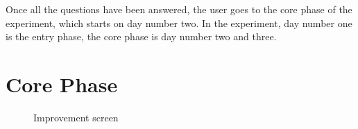 Once all the questions have been answered, the user goes to the core phase of the experiment, which starts on day number two. In the experiment, day number one is the entry phase, the core phase is day number two and three.

\section{Core Phase} \label{core}


\begin{figure}[htp]
  \hspace{1em}
  \caption{Improvement screen\label{fig:imp}}
\end{figure}

